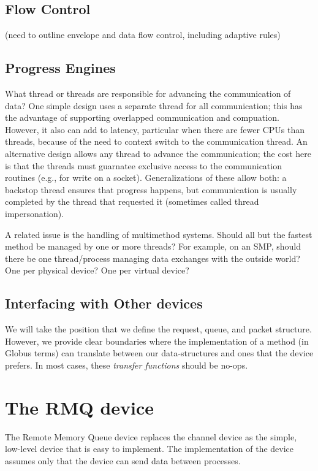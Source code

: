 \documentclass{article}
\begin{document}
\subsection{Flow Control}
(need to outline envelope and data flow control, including adaptive rules)

\subsection{Progress Engines}
What thread or threads are responsible for advancing the communication of
data?  One simple design uses a separate thread for all communication; this
has the advantage of supporting overlapped communication and compuation.
However, it also can add to latency, particular when there are fewer CPUs than
threads, because of the need to context switch to the communication thread.
An alternative design allows any thread to advance the communication; the cost
here is that the threads must guarnatee exclusive access to the communication
routines (e.g., for write on a socket).  Generalizations of these allow both:
a backstop thread ensures that progress happens, but communication is usually
completed by the thread that requested it (sometimes called thread
impersonation).  

A related issue is the handling of multimethod systems.  Should all but the
fastest method be managed by one or more threads?  For example, on an SMP,
should there be one thread/process managing data exchanges with the outside
world?  One per physical device?  One per virtual device?

\subsection{Interfacing with Other devices}
We will take the position that we define the request, queue, and packet
structure.  However, we provide clear boundaries where the implementation of a
method (in Globus terms) can translate between our data-structures and ones
that the device prefers.  In most cases, these \emph{transfer functions}
should be no-ops.

\section{The RMQ device}
The Remote Memory Queue device replaces the channel device as the simple,
low-level device that is easy to implement.   The implementation of the device
assumes only that the device can send data between processes.
\end{document}
